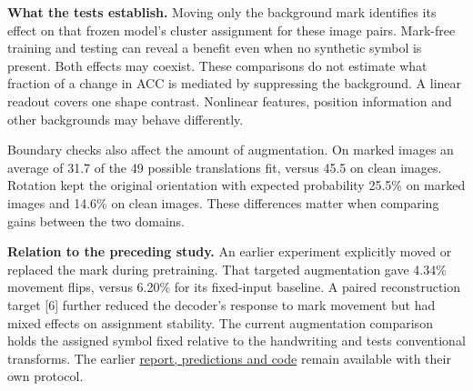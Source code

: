 \newpage
{}


\textbf{What the tests establish.} Moving only the background mark identifies its effect on that frozen model's cluster assignment for these image pairs. Mark-free training and testing can reveal a benefit even when no synthetic symbol is present. Both effects may coexist. These comparisons do not estimate what fraction of a change in ACC is mediated by suppressing the background. A linear readout covers one shape contrast. Nonlinear features, position information and other backgrounds may behave differently.

Boundary checks also affect the amount of augmentation. On marked images an average of 31.7 of the 49 possible translations fit, versus 45.5 on clean images. Rotation kept the original orientation with expected probability 25.5\% on marked images and 14.6\% on clean images. These differences matter when comparing gains between the two domains.

\textbf{Relation to the preceding study.} An earlier experiment explicitly moved or replaced the mark during pretraining. That targeted augmentation gave 4.34\% movement flips, versus 6.20\% for its fixed-input baseline. A paired reconstruction target [6] further reduced the decoder's response to mark movement but had mixed effects on assignment stability. The current augmentation comparison holds the assigned symbol fixed relative to the handwriting and tests conventional transforms. The earlier \href{https://github.com/JohnR31N/cs126FinalProj/tree/idec-final-v1.5/IDEC}{report, predictions and code} remain available with their own protocol.
